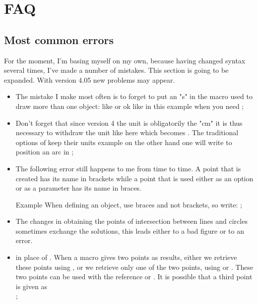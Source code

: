 \section{FAQ} 

\subsection{Most common errors}
 For the moment, I'm basing myself on my own, because having changed syntax several times, I've made a number of mistakes. This section is going to be expanded. With version 4.05 new problems may appear.
 
\begin{itemize}\setlength{\itemsep}{10pt}
  \item The mistake I make most often is to forget to put an "s" in the macro used to draw more than one object: like  or  ok like in this example  when you need  ;
  
  \item Don't forget that since version 4 the unit is obligatorily the "cm" it is thus necessary to withdraw the unit like here  which becomes . The traditional options of  keep their units example on the other hand one will write  to position an arc in ;
  
  \item The following error still happens to me from time to time. A point that is created has its name in brackets while a point that is used either as an option or as a parameter has its name in braces. 
  
  Example  When defining an object, use braces and not brackets, so write: ;
  
  \item The changes in obtaining the points of intersection between lines and circles sometimes exchange the solutions, this leads either to a bad figure or to an error.
  
  \item {} in place of . When a macro gives two points as results, either we retrieve these points using , or we retrieve only one of the two points, using  or 
  . These two points can be used with the reference  or 
  . It is possible that a third point is given as\\ ;


\end{itemize}
